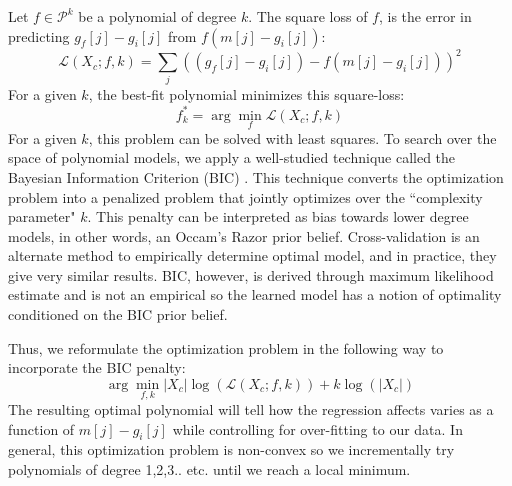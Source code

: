 Let $f\in \mathcal{P}^k$ be a polynomial of degree $k$.
The square loss of $f$, is the error in predicting $g_f[j] - g_i[j]$ from $f(m[j] - g_i[j])$:
\begin{equation}
\mathcal{L}(X_c;f,k) = \sum_j ((g_f[j] - g_i[j]) - f(m[j] - g_i[j]))^2 
\end{equation}
For a given $k$, the best-fit polynomial minimizes this square-loss:
\begin{equation}
f^*_k =\arg \min_f \mathcal{L}(X_c;f,k)
\end{equation}
For a given $k$, this problem can be solved with least squares.
To search over the space of polynomial models, we apply a well-studied technique called the Bayesian Information Criterion (BIC) \cite{schwarz1978estimating,burnham2002model}.
This technique converts the optimization problem into a penalized problem that jointly optimizes over the ``complexity parameter" $k$.
This penalty can be interpreted as bias towards lower degree models, in other words, an Occam's Razor prior belief. 
Cross-validation is an alternate method to empirically determine optimal model, and in practice, they give very similar results.
BIC, however, is derived through maximum likelihood estimate and is not an empirical so the learned model has a notion of optimality conditioned on the BIC prior belief.

Thus, we reformulate the optimization problem in the following way to incorporate the BIC penalty:
\begin{equation}
\arg \min_{f,k} |X_c|\log(\mathcal{L}(X_c;f,k)) + k\log(|X_c|)
\end{equation}
The resulting optimal polynomial will tell how the regression affects varies as a function of $m[j] - g_i[j]$ while controlling for over-fitting to our data.
In general, this optimization problem is non-convex so we incrementally try polynomials of degree 1,2,3.. etc. until we reach a local minimum.


